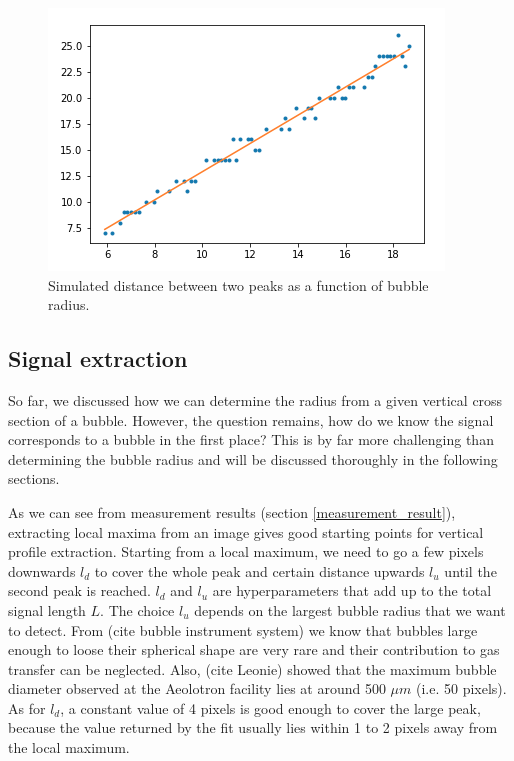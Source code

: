 		\begin{figure}
			\centering
			\includegraphics[scale=.7]{graphs/peak_distance_radius_fit.png}
			\caption{Simulated distance between two peaks as a function of bubble radius.}
			\label{fig:peaks_radius_fit}
		\end{figure}
	
	
	
	\subsection{Signal extraction}
		So far, we discussed how we can determine the radius from a given vertical cross section of a bubble. However, the question remains, how do we know the signal corresponds to a bubble in the first place? This is by far more challenging than determining the bubble radius and will be discussed thoroughly in the following sections. 
		
		As we can see from measurement results (section \ref{measurement_result}), extracting local maxima from an image gives good starting points for vertical profile extraction. Starting from a local maximum, we need to go a few pixels downwards $l_{d}$ to cover the whole peak and certain distance upwards $l_u$ until the second peak is reached. $l_d$ and $l_u$ are hyperparameters that add up to the total signal length $L$. The choice $l_u$ depends on the largest bubble radius that we want to detect. From (cite bubble instrument system) we know that bubbles large enough to loose their spherical shape are very rare and their contribution to gas transfer can be neglected. Also, (cite Leonie) showed that the maximum bubble diameter observed at the Aeolotron facility lies at around 500 $\mu m$ (i.e. 50 pixels). As for $l_d$, a constant value of 4 pixels is good enough to cover the large peak, because the value returned by the fit usually lies within 1 to 2 pixels away from the local maximum. 	
	
